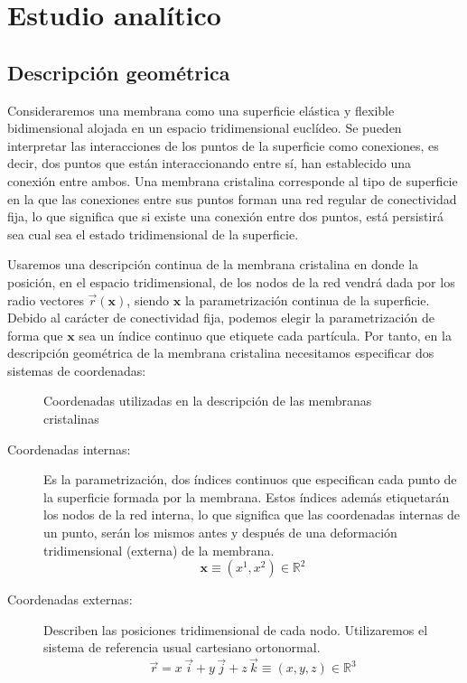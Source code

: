 \chapter{Estudio analítico}

\section{Descripción geométrica}

Consideraremos una membrana como una superficie elástica y flexible 
bidimensional alojada en un espacio tridimensional euclídeo. 
Se pueden interpretar las interacciones de los puntos de la superficie como
conexiones, es decir, dos puntos que están interaccionando entre sí, han
establecido una conexión entre ambos. Una membrana cristalina corresponde al
tipo de superficie en la que las conexiones entre sus puntos forman una red
regular de conectividad fija, lo que significa que si existe
 una conexión entre dos puntos, está persistirá sea
cual sea el estado tridimensional de la superficie.

Usaremos una descripción continua de la membrana cristalina \cite{David:geometria} en donde la
posición, en el espacio tridimensional, de los nodos de la red vendrá dada por los
radio vectores $\vec{r}(\mathbf{x})$, siendo $\mathbf{x}$ la parametrización
continua de la superficie. Debido al carácter de conectividad fija, podemos
elegir la parametrización de forma que $\mathbf{x}$ sea un índice continuo
que etiquete cada partícula. Por tanto, en la descripción geométrica de la
membrana cristalina necesitamos especificar dos sistemas de coordenadas:

\begin{figure}[h]
\centering
{}
\quad
{}
\caption{Coordenadas utilizadas en la descripción de las membranas cristalinas}
\end{figure}

\begin{description}
\item[Coordenadas internas:] Es la parametrización, dos índices continuos que
  especifican cada punto de la superficie formada por la membrana. Estos
  índices además etiquetarán los nodos de la red interna, lo que significa que las
  coordenadas internas de un punto, serán los mismos antes y después de una
  deformación tridimensional (externa) de la membrana. 
  \begin{equation*}
  \mathbf{x}\equiv (x^1,x^2)\in \mathbb{R}^2
  \end{equation*}
\item[Coordenadas externas:] Describen las posiciones tridimensional de cada
  nodo. Utilizaremos el sistema de referencia usual cartesiano ortonormal.
  \begin{equation*}
    \vec{r}=x\,\vec{i}+y\,\vec{j}+z\,\vec{k}\equiv (x,y,z)\in \mathbb{R}^3
  \end{equation*}
\end{description}

